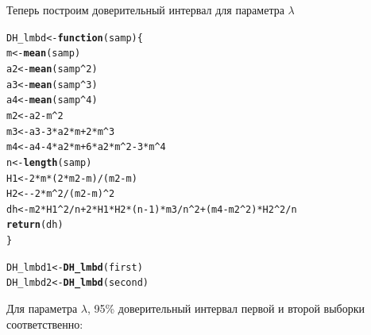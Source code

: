 \documentclass{article}\usepackage[]{graphicx}\usepackage[]{color}
\makeatletter
\newcommand{\hlnum}[1]{\textcolor[rgb]{0.686,0.059,0.569}{#1}}%
\newcommand{\hlopt}[1]{\textcolor[rgb]{0,0,0}{#1}}%
\newcommand{\hlstd}[1]{\textcolor[rgb]{0.345,0.345,0.345}{#1}}%
\newcommand{\hlkwa}[1]{\textcolor[rgb]{0.161,0.373,0.58}{\textbf{#1}}}%
\newcommand{\hlkwb}[1]{\textcolor[rgb]{0.69,0.353,0.396}{#1}}%
\newcommand{\hlkwc}[1]{\textcolor[rgb]{0.333,0.667,0.333}{#1}}%
\newcommand{\hlkwd}[1]{\textcolor[rgb]{0.737,0.353,0.396}{\textbf{#1}}}%
\newenvironment{kframe}{%
 \def\at@end@of@kframe{}%
 \ifinner\ifhmode%
  \def\at@end@of@kframe{\end{minipage}}%
  \begin{minipage}{\columnwidth}%
 \fi\fi%
 \def\FrameCommand##1{\hskip\@totalleftmargin \hskip-\fboxsep
 \colorbox{shadecolor}{##1}\hskip-\fboxsep
     \hskip-\linewidth \hskip-\@totalleftmargin \hskip\columnwidth}%
 \MakeFramed {\advance\hsize-\width
   \@totalleftmargin\z@ \linewidth\hsize
   \@setminipage}}%
 {\par\unskip\endMakeFramed%
 \at@end@of@kframe}
\newenvironment{knitrout}{}{} %
\makeatother
\begin{document}
Теперь построим доверительный интервал для параметра $\lambda$

\begin{knitrout}
\color{fgcolor}\begin{kframe}
\begin{alltt}
\hlstd{DH_lmbd} \hlkwb{<-} \hlkwa{function}\hlstd{(}\hlkwc{samp}\hlstd{)\{}
  \hlstd{m} \hlkwb{<-} \hlkwd{mean}\hlstd{(samp)}
  \hlstd{a2} \hlkwb{<-} \hlkwd{mean}\hlstd{(samp}\hlopt{^}\hlnum{2}\hlstd{)}
  \hlstd{a3} \hlkwb{<-} \hlkwd{mean}\hlstd{(samp}\hlopt{^}\hlnum{3}\hlstd{)}
  \hlstd{a4} \hlkwb{<-} \hlkwd{mean}\hlstd{(samp}\hlopt{^}\hlnum{4}\hlstd{)}
  \hlstd{m2} \hlkwb{<-} \hlstd{a2} \hlopt{-} \hlstd{m}\hlopt{^}\hlnum{2}
  \hlstd{m3} \hlkwb{<-} \hlstd{a3} \hlopt{-} \hlnum{3} \hlopt{*} \hlstd{a2} \hlopt{*} \hlstd{m} \hlopt{+} \hlnum{2} \hlopt{*} \hlstd{m}\hlopt{^}\hlnum{3}
  \hlstd{m4} \hlkwb{<-} \hlstd{a4} \hlopt{-} \hlnum{4} \hlopt{*} \hlstd{a2} \hlopt{*} \hlstd{m} \hlopt{+} \hlnum{6} \hlopt{*} \hlstd{a2} \hlopt{*} \hlstd{m}\hlopt{^}\hlnum{2} \hlopt{-} \hlnum{3} \hlopt{*} \hlstd{m}\hlopt{^}\hlnum{4}
  \hlstd{n} \hlkwb{<-} \hlkwd{length}\hlstd{(samp)}
  \hlstd{H1} \hlkwb{<-} \hlnum{2} \hlopt{*} \hlstd{m} \hlopt{*} \hlstd{(}\hlnum{2} \hlopt{*} \hlstd{m2} \hlopt{-} \hlstd{m)} \hlopt{/} \hlstd{(m2} \hlopt{-} \hlstd{m)}
  \hlstd{H2} \hlkwb{<-} \hlopt{-}\hlnum{2} \hlopt{*} \hlstd{m}\hlopt{^}\hlnum{2} \hlopt{/} \hlstd{(m2} \hlopt{-} \hlstd{m)}\hlopt{^}\hlnum{2}
  \hlstd{dh} \hlkwb{<-} \hlstd{m2} \hlopt{*} \hlstd{H1}\hlopt{^}\hlnum{2} \hlopt{/} \hlstd{n} \hlopt{+} \hlnum{2} \hlopt{*} \hlstd{H1} \hlopt{*} \hlstd{H2} \hlopt{*} \hlstd{(n} \hlopt{-} \hlnum{1}\hlstd{)} \hlopt{*} \hlstd{m3} \hlopt{/} \hlstd{n}\hlopt{^}\hlnum{2} \hlopt{+} \hlstd{(m4} \hlopt{-} \hlstd{m2}\hlopt{^}\hlnum{2}\hlstd{)} \hlopt{*} \hlstd{H2}\hlopt{^}\hlnum{2} \hlopt{/} \hlstd{n}
  \hlkwd{return}\hlstd{(dh)}
\hlstd{\}}

\hlstd{DH_lmbd1} \hlkwb{<-} \hlkwd{DH_lmbd}\hlstd{(first)}
\hlstd{DH_lmbd2} \hlkwb{<-} \hlkwd{DH_lmbd}\hlstd{(second)}
\end{alltt}
\end{kframe}
\end{knitrout}

Для параметра $\lambda$, 95\% доверительный интервал первой и второй выборки соответственно:
\end{document}
